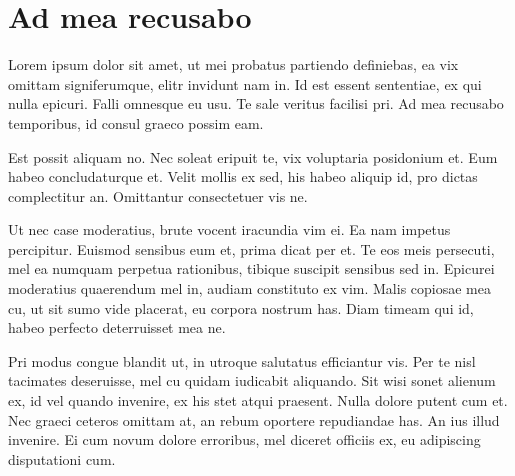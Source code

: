 \chapter{Ad mea recusabo}
Lorem ipsum dolor sit amet, ut mei probatus partiendo definiebas, ea vix omittam signiferumque, elitr invidunt nam in. Id est essent sententiae, ex qui nulla epicuri. Falli omnesque eu usu. Te sale veritus facilisi pri. Ad mea recusabo temporibus, id consul graeco possim eam.

Est possit aliquam no. Nec soleat eripuit te, vix voluptaria posidonium et. Eum habeo concludaturque et. Velit mollis ex sed, his habeo aliquip id, pro dictas complectitur an. Omittantur consectetuer vis ne.

Ut nec case moderatius, brute vocent iracundia vim ei. Ea nam impetus percipitur. Euismod sensibus eum et, prima dicat per et. Te eos meis persecuti, mel ea numquam perpetua rationibus, tibique suscipit sensibus sed in. Epicurei moderatius quaerendum mel in, audiam constituto ex vim. Malis copiosae mea cu, ut sit sumo vide placerat, eu corpora nostrum has. Diam timeam qui id, habeo perfecto deterruisset mea ne.

Pri modus congue blandit ut, in utroque salutatus efficiantur vis. Per te nisl tacimates deseruisse, mel cu quidam iudicabit aliquando. Sit wisi sonet alienum ex, id vel quando invenire, ex his stet atqui praesent. Nulla dolore putent cum et. Nec graeci ceteros omittam at, an rebum oportere repudiandae has. An ius illud invenire. Ei cum novum dolore erroribus, mel diceret officiis ex, eu adipiscing disputationi cum.
